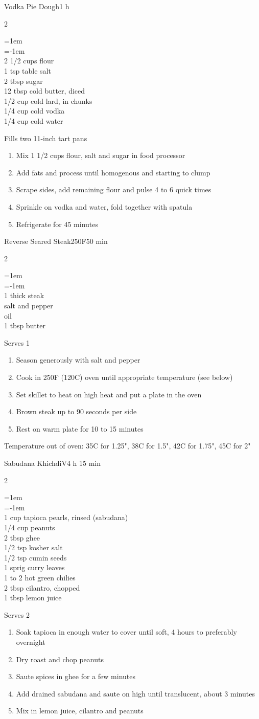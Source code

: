 \documentclass{article}
\newenvironment{recipe}[3][]
    {\begin{cardbase}[#1]{#2}{#3}
    \columnratio{0.333}
    \begin{paracol}{2}}
    {\end{paracol}\end{cardbase}}
\newcommand{\nextcolumn}{\switchcolumn}
\newenvironment{ingredients}
    {
    \begin{obeylines}
    \vspace{\parskip}
    \setlength{\parskip}{0.25em}
    \vspace{-0.25em}
    \leftskip=1em
    \parindent=-1em}
    {\end{obeylines}}
\newenvironment{steps}
    {\begin{enumerate}[leftmargin=*,topsep=0pt]}
    {\end{enumerate}}
\newcommand{\celsius}[1]{#1\textdegree{}C}
\newcommand{\fahrenheit}[1]{#1\textdegree{}F}
\newcommand{\tag}[1]{\hspace{1em}#1}
\newcommand{\symboltag}[2]{\tag{#1\hspace{0.4em}#2}}
\newcommand{\totaltime}[1]{\symboltag{\raisebox{-0.1em}{\small\StopWatchEnd}}{#1}}
\newcommand{\preheat}[1]{\symboltag{\Topbottomheat}{#1}}
\begin{document}
\begin{recipe}{Vodka Pie Dough}{\totaltime{1 h}}
\begin{ingredients}
2 1/2 cups  flour
1 tsp table salt
2 tbsp sugar
12 tbsp cold butter, diced
1/2 cup cold lard, in chunks
1/4 cup cold vodka
1/4 cup cold water
\end{ingredients}
\nextcolumn
Fills two 11-inch tart pans
\begin{steps}
    \item Mix 1 1/2 cups flour, salt and sugar in food processor
    \item Add fats and process until homogenous and starting to clump
    \item Scrape sides, add remaining flour and pulse 4 to 6 quick times
    \item Sprinkle on vodka and water, fold together with spatula
    \item Refrigerate for 45 minutes
\end{steps}
\end{recipe}

\begin{recipe}{Reverse Seared Steak}{\preheat{\fahrenheit{250}}\totaltime{50 min}}
\begin{ingredients}
1 thick steak
salt and pepper
oil
1 tbsp butter
\end{ingredients}
\nextcolumn
Serves 1
\begin{steps}
    \item Season generously with salt and pepper
    \item Cook in \fahrenheit{250} (\celsius{120}) oven until appropriate temperature (see below)
    \item Set skillet to heat on high heat and put a plate in the oven
    \item Brown steak up to 90 seconds per side
    \item Rest on warm plate for 10 to 15 minutes
\end{steps}
Temperature out of oven: \celsius{35} for 1.25", \celsius{38} for 1.5", \celsius{42} for 1.75", \celsius{45} for 2"
\end{recipe}

\begin{recipe}{Sabudana Khichdi}{\tag{V}\totaltime{4 h 15 min}}
\begin{ingredients}
1 cup tapioca pearls, rinsed (sabudana)
1/4 cup peanuts
2 tbsp ghee
1/2 tsp kosher salt
1/2 tsp cumin seeds
1 sprig curry leaves
1 to 2 hot green chilies
2 tbsp cilantro, chopped
1 tbsp lemon juice
\end{ingredients}
\nextcolumn
Serves 2
\begin{steps}
    \item Soak tapioca in enough water to cover until soft, 4 hours to preferably overnight
    \item Dry roast and chop peanuts
    \item Saute spices in ghee for a few minutes
    \item Add drained sabudana and saute on high until translucent, about 3 minutes
    \item Mix in lemon juice, cilantro and peanuts
\end{steps}
\end{recipe}
\end{document}
